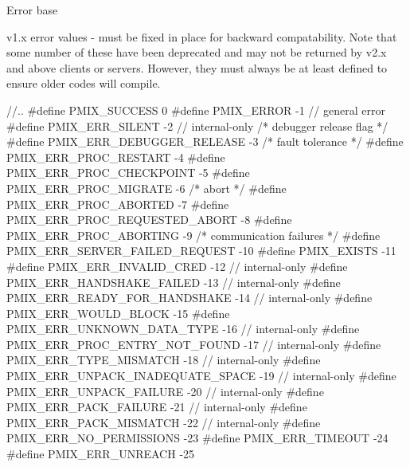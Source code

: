 \begin{constantdesc}
%
Error base
%
\end{constantdesc}

v1.x error values - must be fixed in place for backward compatability.
Note that some number of these have been deprecated and may not be returned by v2.x and above clients or servers.
However, they must always be at least defined to ensure older codes will compile.

%

\cspecificstart
\begin{codepar}
//..
#define PMIX_SUCCESS                                 0
#define PMIX_ERROR                                  -1          // general error
#define PMIX_ERR_SILENT                             -2          // internal-only
/* debugger release flag */
#define PMIX_ERR_DEBUGGER_RELEASE                   -3
/* fault tolerance */
#define PMIX_ERR_PROC_RESTART                       -4
#define PMIX_ERR_PROC_CHECKPOINT                    -5
#define PMIX_ERR_PROC_MIGRATE                       -6
/* abort */
#define PMIX_ERR_PROC_ABORTED                       -7
#define PMIX_ERR_PROC_REQUESTED_ABORT               -8
#define PMIX_ERR_PROC_ABORTING                      -9
/* communication failures */
#define PMIX_ERR_SERVER_FAILED_REQUEST              -10
#define PMIX_EXISTS                                 -11
#define PMIX_ERR_INVALID_CRED                       -12         // internal-only
#define PMIX_ERR_HANDSHAKE_FAILED                   -13         // internal-only
#define PMIX_ERR_READY_FOR_HANDSHAKE                -14         // internal-only
#define PMIX_ERR_WOULD_BLOCK                        -15
#define PMIX_ERR_UNKNOWN_DATA_TYPE                  -16         // internal-only
#define PMIX_ERR_PROC_ENTRY_NOT_FOUND               -17         // internal-only
#define PMIX_ERR_TYPE_MISMATCH                      -18         // internal-only
#define PMIX_ERR_UNPACK_INADEQUATE_SPACE            -19         // internal-only
#define PMIX_ERR_UNPACK_FAILURE                     -20         // internal-only
#define PMIX_ERR_PACK_FAILURE                       -21         // internal-only
#define PMIX_ERR_PACK_MISMATCH                      -22         // internal-only
#define PMIX_ERR_NO_PERMISSIONS                     -23
#define PMIX_ERR_TIMEOUT                            -24
#define PMIX_ERR_UNREACH                            -25

\end{codepar}
